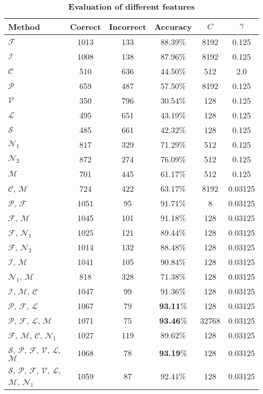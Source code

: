 \documentclass[11pt,english]{article}
\begin{document}
\begin{multicols}{2}
\begin{table*}[!h]
\begin{center}
\caption{\small \textbf{\textsf{Evaluation of different features}}}%
\begin{tabular}{l c c c c c}
\toprule
Method & Correct & Incorrect & Accuracy & $C$ & $\gamma$ \\
\midrule
$\mathcal{F}$ & 1013 & 133 & 88.39\% & 8192 & 0.125\\
$\mathcal{I}$ & 1008 & 138 & 87.96\% & 8192 & 0.125\\
$\mathcal{C}$ & 510 & 636 & 44.50\% & 512 & 2.0\\
$\mathcal{P}$ & 659 & 487 & 57.50\% & 8192 & 0.125\\
$\mathcal{V}$ & 350 & 796 & 30.54\% & 128 & 0.125\\
$\mathcal{L}$ & 495 & 651 & 43.19\% & 128 & 0.125\\
$\mathcal{S}$ & 485 & 661 & 42.32\% & 128 & 0.125\\
$\mathcal{N}_1$ & 817 & 329 & 71.29\% & 512 & 0.125\\
$\mathcal{N}_2$ & 872 & 274 & 76.09\% & 512 & 0.125\\
$\mathcal{M}$ & 701 & 445 & 61.17\% & 512 & 0.125\\
$\mathcal{C}$, $\mathcal{M}$ & 724 & 422 & 63.17\% & 8192 & 0.03125\\
$\mathcal{P}$, $\mathcal{F}$ & 1051 & 95 & 91.71\% & 8 & 0.03125\\
$\mathcal{F}$, $\mathcal{M}$ & 1045 & 101 & 91.18\% & 128 & 0.03125\\
$\mathcal{F}$, $\mathcal{N}_1$ & 1025 & 121 & 89.44\% & 128 & 0.03125\\
$\mathcal{F}$, $\mathcal{N}_2$ & 1014 & 132 & 88.48\% & 128 & 0.03125\\
$\mathcal{I}$, $\mathcal{M}$ & 1041 & 105 & 90.84\% & 128 & 0.03125\\
$\mathcal{N}_1$, $\mathcal{M}$ & 818 & 328 & 71.38\% & 128 & 0.03125\\
$\mathcal{I}$, $\mathcal{M}$, $\mathcal{C}$ & 1047 & 99 & 91.36\% & 128 & 0.03125\\
$\mathcal{P}$, $\mathcal{F}$, $\mathcal{L}$ & 1067 & 79 & \textbf{93.11}\% & 128 & 0.03125\\
$\mathcal{P}$, $\mathcal{F}$, $\mathcal{L}$, $\mathcal{M}$ & 1071 & 75 & \textbf{93.46}\% & 32768 & 0.03125\\
$\mathcal{F}$, $\mathcal{M}$, $\mathcal{C}$, $\mathcal{N}_1$ & 1027 & 119 & 89.62\% & 128 & 0.03125\\
$\mathcal{S}$, $\mathcal{P}$, $\mathcal{F}$, $\mathcal{V}$, $\mathcal{L}$, $\mathcal{M}$ & 1068 & 78 & \textbf{93.19}\% & 128 & 0.03125\\
$\mathcal{S}$, $\mathcal{P}$, $\mathcal{F}$, $\mathcal{V}$, $\mathcal{L}$, $\mathcal{M}$, $\mathcal{N}_1$ & 1059 & 87 & 92.41\% & 128 & 0.03125\\
\bottomrule
\end{tabular}
\label{tbl:eval}%
\end{center}
\end{table*}%


\end{multicols}
\end{document}
